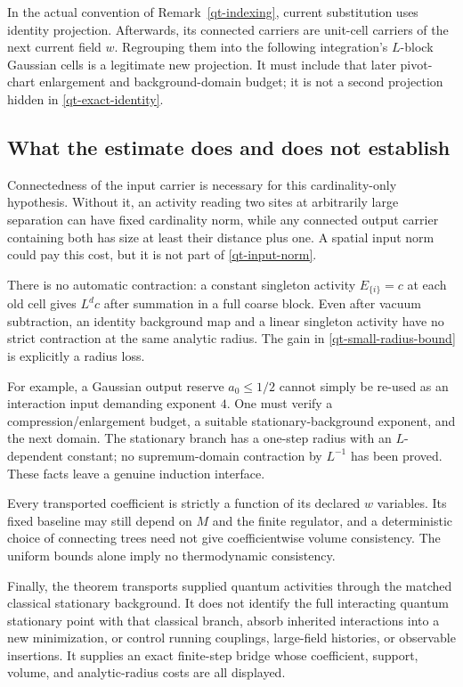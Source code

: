 \documentclass[11pt]{article}
\theoremstyle{remark}
\begin{document}
In the actual convention of Remark~\ref{qt-indexing}, current
substitution uses identity projection. Afterwards, its connected
carriers are unit-cell carriers of the next current field $w$.
Regrouping them into the following integration's $L$-block Gaussian
cells is a legitimate new projection. It must include that later
pivot-chart enlargement and background-domain budget; it is not
a second projection hidden in \eqref{qt-exact-identity}.

\subsection{What the estimate does and does not establish}

Connectedness of the input carrier is necessary for this
cardinality-only hypothesis. Without it, an activity reading two
sites at arbitrarily large separation can have fixed cardinality
norm, while any connected output carrier containing both has size
at least their distance plus one. A spatial input norm could pay
this cost, but it is not part of \eqref{qt-input-norm}.

There is no automatic contraction: a constant singleton activity
$E_{\{i\}}=c$ at each old cell gives $L^d c$ after summation in
a full coarse block. Even after vacuum subtraction, an identity
background map and a linear singleton activity have no strict
contraction at the same analytic radius. The gain in
\eqref{qt-small-radius-bound} is explicitly a radius loss.

For example, a Gaussian output reserve $a_0\le1/2$ cannot simply
be re-used as an interaction input demanding exponent $4$.
One must verify a compression/enlargement budget, a suitable
stationary-background exponent, and the next domain. The
stationary branch has a one-step radius with an $L$-dependent
constant; no supremum-domain contraction by $L^{-1}$ has been
proved. These facts leave a genuine induction interface.

Every transported coefficient is strictly a function of its
declared $w$ variables. Its fixed baseline may still depend on
$M$ and the finite regulator, and a deterministic choice of
connecting trees need not give coefficientwise volume consistency.
The uniform bounds alone imply no thermodynamic consistency.

Finally, the theorem transports supplied quantum activities
through the matched classical stationary background. It does
not identify the full interacting quantum stationary point with
that classical branch, absorb inherited interactions into a new
minimization, or control running couplings, large-field histories,
or observable insertions. It supplies an exact finite-step bridge
whose coefficient, support, volume, and analytic-radius costs
are all displayed.
\end{document}
